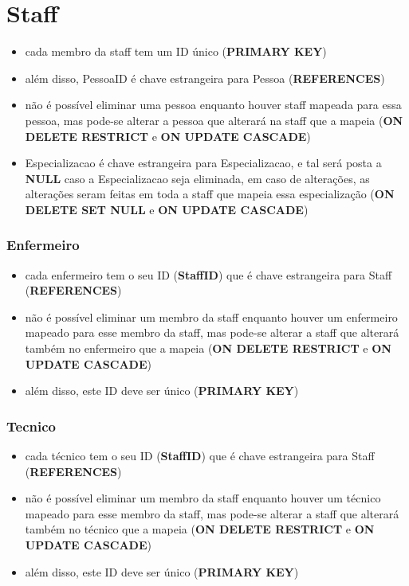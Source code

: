 \documentclass[article, a4paper, 12pt, oneside]{memoir}
\begin{document}
\section*{Staff}
\begin{itemize}
	\item cada membro da staff tem um ID único (\textbf{PRIMARY KEY})
	\item além disso, PessoaID é chave estrangeira para Pessoa (\textbf{REFERENCES})
	\item não é possível eliminar uma pessoa enquanto houver staff mapeada para essa pessoa, mas pode-se alterar a pessoa que alterará na staff que a mapeia (\textbf{ON DELETE RESTRICT} e \textbf{ON UPDATE CASCADE})
	\item Especializacao é chave estrangeira para Especializacao, e tal será posta a \textbf{NULL} caso a Especializacao seja eliminada, em caso de alterações, as alterações seram feitas em toda a staff que mapeia essa especialização (\textbf{ON DELETE SET NULL} e \textbf{ON UPDATE CASCADE})
\end{itemize}

\subsubsection*{Enfermeiro}
\begin{itemize}
	\item cada enfermeiro tem o seu ID (\textbf{StaffID}) que é chave estrangeira para Staff (\textbf{REFERENCES})
	\item não é possível eliminar um membro da staff enquanto houver um enfermeiro mapeado para esse membro da staff, mas pode-se alterar a staff que alterará também no enfermeiro que a mapeia (\textbf{ON DELETE RESTRICT} e \textbf{ON UPDATE CASCADE})
	\item além disso, este ID deve ser único (\textbf{PRIMARY KEY})
\end{itemize}

\newpage

\subsubsection*{Tecnico}
\begin{itemize}
	\item cada técnico tem o seu ID (\textbf{StaffID}) que é chave estrangeira para Staff (\textbf{REFERENCES})
	\item não é possível eliminar um membro da staff enquanto houver um técnico mapeado para esse membro da staff, mas pode-se alterar a staff que alterará também no técnico que a mapeia (\textbf{ON DELETE RESTRICT} e \textbf{ON UPDATE CASCADE})
	\item além disso, este ID deve ser único (\textbf{PRIMARY KEY})
\end{itemize}
\end{document}

